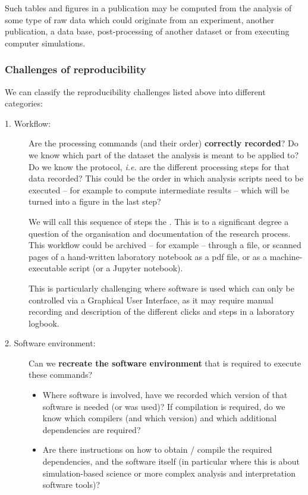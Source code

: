 Such tables and figures in a publication may be computed from the analysis of
some type of raw data which could originate from an experiment, another publication,
a data base, post-processing of another dataset or from executing computer
simulations.


\subsubsection{Challenges of reproducibility}\label{sec:reproducibility-challenges}

We can classify the reproducibility challenges listed above into different categories:

\begin{description}
\item[1. Workflow:] Are the processing commands (and their order)
\textbf{correctly recorded}? Do we know which part of the dataset the analysis is meant to be applied to? Do we know the protocol, \emph{i.e.} are the different processing steps for that data recorded? This could be the order in which analysis scripts need to be executed -- for example to compute intermediate results -- which will be turned into a figure in the last step?

We will call this sequence of steps the . This is to a significant degree a question of the organisation and documentation of the research process. This workflow could be archived -- for example -- through a  file, or scanned pages of a hand-written laboratory notebook as a pdf file, or as a
machine-executable script (or a Jupyter notebook).

This is particularly challenging where software is used which can only be
controlled via a Graphical User Interface, as it may require manual recording
and description of the different clicks and steps in a laboratory logbook.

\item[2. Software environment:] Can we \textbf{recreate the software environment} that is required to execute these commands?
\begin{itemize}
\item Where software is involved, have we recorded which version of that software is needed (or was used)? If compilation is required, do we know which compilers (and which version) and which additional dependencies are required?
\item Are there instructions on how to obtain / compile the required dependencies,
and the software itself (in particular where this is about simulation-based
science or more complex analysis and interpretation software tools)?
\end{itemize}


\end{description}
